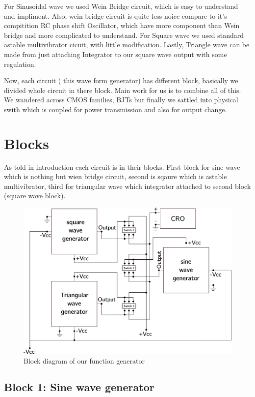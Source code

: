 \documentclass{article}
\begin{document}
For Sinusoidal wave we used Wein Bridge circuit, which is easy to understand and impliment. Also, wein bridge circuit is quite less noice compare to it's compitition RC phase shift Oscillator, which have more component than Wein bridge and more complicated to understand. For Square wave we used standard astable multivibrator cicuit, with little modification. Lastly, Triangle wave can be made from just attaching Integrator to our square wave output with some regulation.

Now, each circuit ( this wave form generator) has different block, basically we divided whole circuit in there block. Main work for us is to combine all of this. We wandered across CMOS families, BJTs but finally we sattled into physical swith which is coupled for power transmission and also for output change.

\section{Blocks}
\label{sec:orge29d897}


As told in introduction each circuit is in their blocks. First block for sine wave which is nothing but wien bridge circuit, second is sqaure which is astable multivibrator, third for triangular wave which integrator attached to second block (square wave block).


\begin{figure}[htbp]
\centering
\includegraphics[width=.8\textwidth]{imgs/blocks.png}
\caption{\label{fig:org8a88cef}Block diagram of our function generator}
\end{figure}


\subsection{Block 1: Sine wave generator}
\label{sec:orgbce7474}
\end{document}
